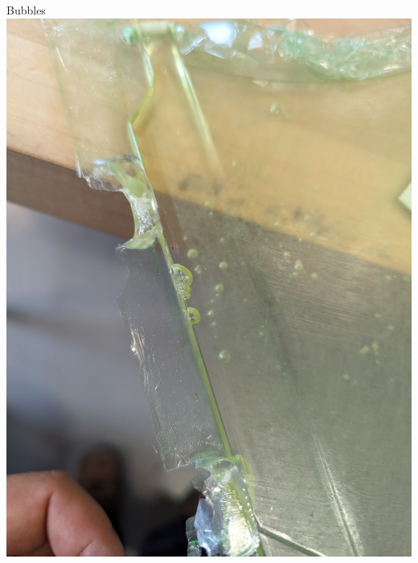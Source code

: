 \begin{frame}{Bubbles}
    \includegraphics[height=0.5\textheight,keepaspectratio]{images/sf_root_bubbles_3.jpg}
\end{frame}

